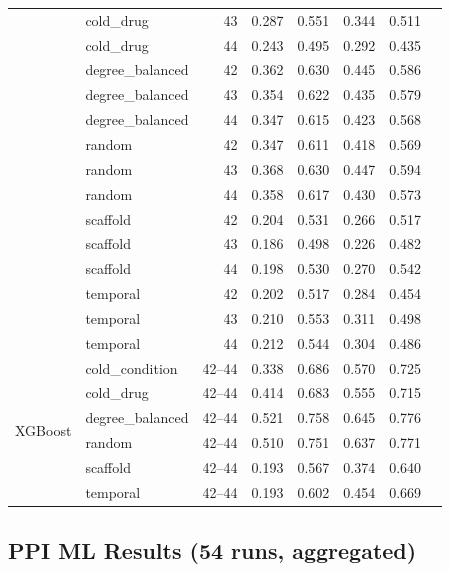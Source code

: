 \begin{table}[h]
\begin{tabular}{@{}llrccccc@{}}
& cold\_drug & 43 & 0.287 & 0.551 & 0.344 & 0.511 \\
& cold\_drug & 44 & 0.243 & 0.495 & 0.292 & 0.435 \\
& degree\_balanced & 42 & 0.362 & 0.630 & 0.445 & 0.586 \\
& degree\_balanced & 43 & 0.354 & 0.622 & 0.435 & 0.579 \\
& degree\_balanced & 44 & 0.347 & 0.615 & 0.423 & 0.568 \\
& random & 42 & 0.347 & 0.611 & 0.418 & 0.569 \\
& random & 43 & 0.368 & 0.630 & 0.447 & 0.594 \\
& random & 44 & 0.358 & 0.617 & 0.430 & 0.573 \\
& scaffold & 42 & 0.204 & 0.531 & 0.266 & 0.517 \\
& scaffold & 43 & 0.186 & 0.498 & 0.226 & 0.482 \\
& scaffold & 44 & 0.198 & 0.530 & 0.270 & 0.542 \\
& temporal & 42 & 0.202 & 0.517 & 0.284 & 0.454 \\
& temporal & 43 & 0.210 & 0.553 & 0.311 & 0.498 \\
& temporal & 44 & 0.212 & 0.544 & 0.304 & 0.486 \\
\midrule
\multirow{18}{*}{XGBoost}
& cold\_condition & 42--44 & 0.338 & 0.686 & 0.570 & 0.725 \\
& cold\_drug & 42--44 & 0.414 & 0.683 & 0.555 & 0.715 \\
& degree\_balanced & 42--44 & 0.521 & 0.758 & 0.645 & 0.776 \\
& random & 42--44 & 0.510 & 0.751 & 0.637 & 0.771 \\
& scaffold & 42--44 & 0.193 & 0.567 & 0.374 & 0.640 \\
& temporal & 42--44 & 0.193 & 0.602 & 0.454 & 0.669 \\
\bottomrule
\end{tabular}
\end{table}


\subsection{PPI ML Results (54 runs, aggregated)}


